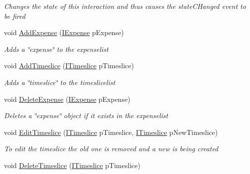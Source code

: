 \begin{DoxyCompactItemize}
\begin{DoxyCompactList}\small\item\em Changes the state of this interaction and thus causes the state\+C\+Hanged event to be fired \end{DoxyCompactList}\item 
void \hyperlink{class_plex_byte_1_1_mo_cap_1_1_interactions_1_1_account_a0f69931bd1d21cb3692f0f08918247bd}{Add\+Expense} (\hyperlink{interface_plex_byte_1_1_mo_cap_1_1_interactions_1_1_i_expense}{I\+Expense} p\+Expense)
\begin{DoxyCompactList}\small\item\em Adds a \char`\"{}expense\char`\"{} to the expenselist \end{DoxyCompactList}\item 
void \hyperlink{class_plex_byte_1_1_mo_cap_1_1_interactions_1_1_account_a28d01e56bb3fc78f30f4ed5f259c0e17}{Add\+Timeslice} (\hyperlink{interface_plex_byte_1_1_mo_cap_1_1_interactions_1_1_i_timeslice}{I\+Timeslice} p\+Timeslice)
\begin{DoxyCompactList}\small\item\em Adds a \char`\"{}timeslice\char`\"{} to the timeslicelist \end{DoxyCompactList}\item 
void \hyperlink{class_plex_byte_1_1_mo_cap_1_1_interactions_1_1_account_a84d71e01b4a2a2483b52bc67635499ed}{Delete\+Expense} (\hyperlink{interface_plex_byte_1_1_mo_cap_1_1_interactions_1_1_i_expense}{I\+Expense} p\+Expense)
\begin{DoxyCompactList}\small\item\em Deletes a \char`\"{}expense\char`\"{} object if it exists in the expenselist \end{DoxyCompactList}\item 
void \hyperlink{class_plex_byte_1_1_mo_cap_1_1_interactions_1_1_account_a3baea063609ff894849c852c249a3c7a}{Edit\+Timeslice} (\hyperlink{interface_plex_byte_1_1_mo_cap_1_1_interactions_1_1_i_timeslice}{I\+Timeslice} p\+Timeslice, \hyperlink{interface_plex_byte_1_1_mo_cap_1_1_interactions_1_1_i_timeslice}{I\+Timeslice} p\+New\+Timeslice)
\begin{DoxyCompactList}\small\item\em To edit the timeslice the old one is removed and a new is being created \end{DoxyCompactList}\item 
void \hyperlink{class_plex_byte_1_1_mo_cap_1_1_interactions_1_1_account_a8b8d09b65d60431bdbbef7d3aed6a72b}{Delete\+Timeslice} (\hyperlink{interface_plex_byte_1_1_mo_cap_1_1_interactions_1_1_i_timeslice}{I\+Timeslice} p\+Timeslice)

\end{DoxyCompactItemize}
